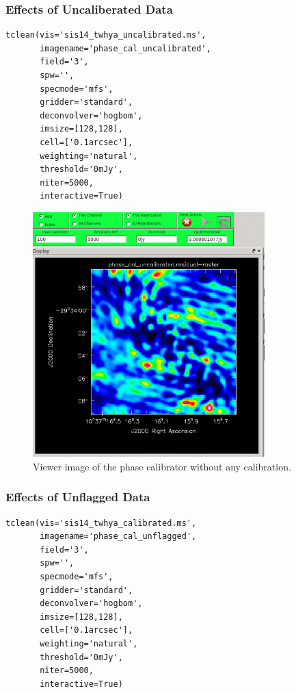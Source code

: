 \clearpage

\subsubsection{Effects of Uncaliberated Data}

\begin{lstlisting}[style=casa-python]
tclean(vis='sis14_twhya_uncalibrated.ms',
       imagename='phase_cal_uncalibrated',
       field='3',
       spw='',
       specmode='mfs',
       gridder='standard',
       deconvolver='hogbom',
       imsize=[128,128],
       cell=['0.1arcsec'],
       weighting='natural',
       threshold='0mJy',
       niter=5000,
       interactive=True)
\end{lstlisting}

\begin{figure}[H]
       \centering
       \includegraphics[width=0.8\textwidth]{Images/uncaliberated-image.png}
       \caption{Viewer image of the phase calibrator without any calibration.}
\end{figure}

\subsubsection{Effects of Unflagged Data}

\begin{lstlisting}[style=casa-python]
tclean(vis='sis14_twhya_calibrated.ms',
       imagename='phase_cal_unflagged',
       field='3',
       spw='',
       specmode='mfs',
       gridder='standard',
       deconvolver='hogbom',
       imsize=[128,128],
       cell=['0.1arcsec'],
       weighting='natural',
       threshold='0mJy',
       niter=5000,
       interactive=True)
\end{lstlisting}

